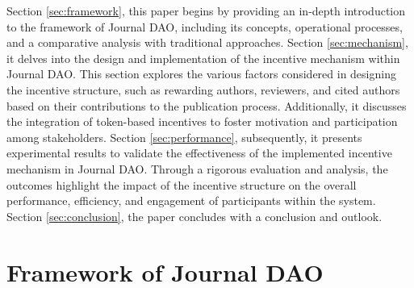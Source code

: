 \documentclass[lettersize,journal]{IEEEtran}
\begin{document}
Section \ref{sec:framework}, this paper begins by providing an in-depth introduction to the framework of Journal DAO, including its concepts, operational processes, and a comparative analysis with traditional approaches. 
Section \ref{sec:mechanism}, it delves into the design and implementation of the incentive mechanism within Journal DAO. This section explores the various factors considered in designing the incentive structure, such as rewarding authors, reviewers, and cited authors based on their contributions to the publication process. Additionally, it discusses the integration of token-based incentives to foster motivation and participation among stakeholders.
Section \ref{sec:performance}, subsequently, it presents experimental results to validate the effectiveness of the implemented incentive mechanism in Journal DAO. Through a rigorous evaluation and analysis, the outcomes highlight the impact of the incentive structure on the overall performance, efficiency, and engagement of participants within the system.
Section \ref{sec:conclusion}, the paper concludes with a conclusion and outlook.



\section{Framework of Journal DAO \label{sec:framework}}




\end{document}
